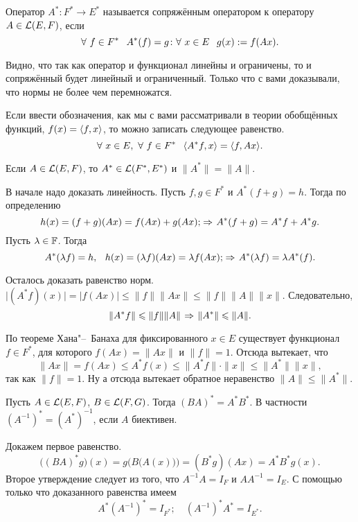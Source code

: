 \begin{Def}
 Оператор $A^*\colon F^*\to E^*$ называется сопряжённым оператором к оператору $A\in \mathcal L(E,F)$, если 
\[
  \forall\ f\in F^*\pau A^*(f) = g\colon \forall\ x\in E\pau g(x):=f(Ax).
\]
\end{Def}
Видно, что так как оператор и функционал линейны и ограничены, то и сопряжённый будет линейный и ограниченный. Только что с вами доказывали, что нормы не более чем перемножатся.

Если ввести обозначения, как мы с вами рассматривали в теории обобщённых функций, $f(x) = \langle f,x\rangle$, то можно записать следующее равенство.
\[
  \forall\ x\in E,\ \forall\ f\in F^*\pau \la A^*f,x\ra = \la f,Ax\ra.
\]

\begin{Ut}
  Если $A\in\mathcal L(E,F)$, то $A^*\in\mathcal L(F^*,E^*)$ и $\|A^*\|=\|A\|$.
\end{Ut}
\begin{Proof}
  В начале надо доказать линейность. Пусть $f,g\in F^*$ и $A^*(f+g)=h$. Тогда по определению 
\[
h(x) = (f+g)(Ax) = f(Ax) + g(Ax);\hspace{1pt plus1pt}\Rightarrow\hspace{1pt plus1pt} A^*(f+g) = A^*f+A^*g.
\]
Пусть $\lambda\in\mathbb F$. Тогда
\[
  A^*(\lambda f) = h,\hskip .75em plus.1em minus.08em\relax h(x) = (\lambda f)(Ax) = \lambda f(Ax);\hspace{1pt plus1pt}\Rightarrow\hspace{1pt plus1pt} A^*(\lambda f) = \lambda A^*(f).
\]

Осталось доказать равенство норм. $\big|(A^*f)(x)\big| = \big|f(Ax)\big|\le \|f\|\|Ax\|\le \|f\|\|A\|\|x\|$. Следовательно,
\[
  \|A^*f\|\leqslant \|f\|\|A\|\hspace{1pt plus1pt}\Rightarrow\hspace{1pt plus1pt} \|A^*\|\leqslant \|A\|.
\]

По теореме Хана"--~Банаха для фиксированного $x\in E$ существует функционал $f\in F^*$, для которого $f(Ax) = \|Ax\|$ и $\|f\|=1$. Отсюда вытекает, что 
\[
\|Ax\| = f(Ax)\le A^*f(x)\le \|A^*f\|\cdot\|x\|\le \|A^*\|\|x\|,
\]
так как $\|f\|=1$. Ну а отсюда вытекает обратное неравенство $\|A\|\le \|A^*\|$.
\end{Proof}
\begin{Ut}\label{soprobr}
  Пусть $A\in \mathcal L(E,F)$, $B\in \mathcal L(F,G)$. Тогда $(BA)^* = A^*B^*$. В частности $(A^{-1})^* = (A^*)^{-1}$, если $A$ биективен.
\end{Ut}
\begin{Proof}
Докажем первое равенство.
\[
  \big((BA)^*g\big)(x) =g\Big(B\big(A(x)\big)\Big) = (B^*g)(Ax) = A^*B^*g(x).
\]
Второе утверждение следует из того, что $A^{-1}A = I_F$ и $AA^{-1} = I_E$. С помощью только что доказанного равенства имеем
\[
  A^*(A^{-1})^* = I_{F^*};\quad (A^{-1})^*A^* = I_{E^*}.
\]
\end{Proof}


